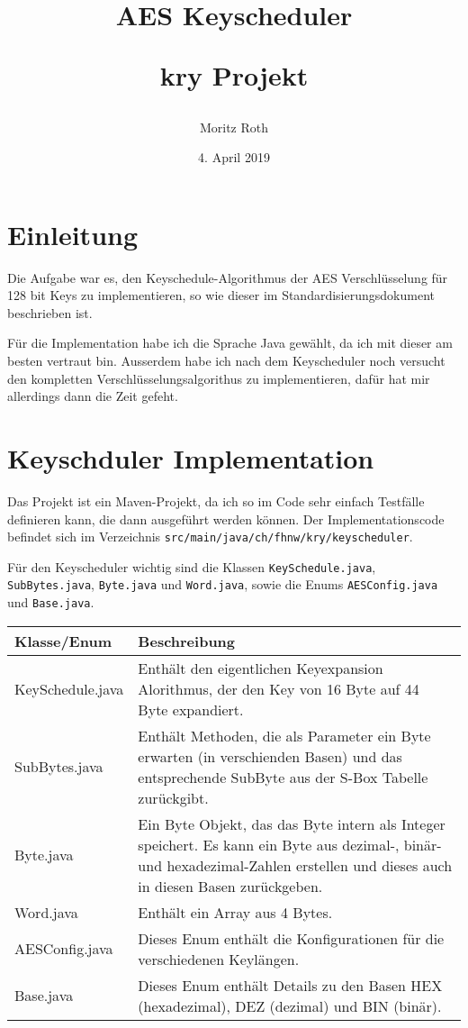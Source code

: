 \documentclass[12pt, letterpaper]{article}
\title{AES Keyscheduler \\
\begin{large}
kry Projekt
\end{large} }
\author{Moritz Roth}
\date{4. April 2019}
\newcommand{\code}[1]{\texttt{#1}}
\begin{document}
\maketitle

\section*{Einleitung}
Die Aufgabe war es, den Keyschedule-Algorithmus der AES Verschlüsselung für 128 bit Keys zu implementieren, so wie dieser im Standardisierungsdokument beschrieben ist.

Für die Implementation habe ich die Sprache Java gewählt, da ich mit dieser am besten vertraut bin. Ausserdem habe ich nach dem Keyscheduler noch versucht den kompletten Verschlüsselungsalgorithus zu implementieren, dafür hat mir allerdings dann die Zeit gefeht.

\section*{Keyschduler Implementation}

Das Projekt ist ein Maven-Projekt, da ich so im Code sehr einfach Testfälle definieren kann, die dann ausgeführt werden können. Der Implementationscode befindet sich im Verzeichnis \code{src/main/java/ch/fhnw/kry/keyscheduler}.


Für den Keyscheduler wichtig sind die Klassen \code{KeySchedule.java}, \code{SubBytes.java}, \code{Byte.java} und \code{Word.java}, sowie die Enums \code{AESConfig.java} und \code{Base.java}.

\begin{center}
  {\tablinesep=10pt\begin{tabular}{l|p{10cm}}
  Klasse/Enum & Beschreibung \\ \hline
  KeySchedule.java & Enthält den eigentlichen Keyexpansion Alorithmus, der den Key von 16 Byte auf 44 Byte expandiert. \\
  SubBytes.java & Enthält Methoden, die als Parameter ein Byte erwarten (in verschienden Basen) und das entsprechende SubByte aus der S-Box Tabelle zurückgibt. \\
  Byte.java & Ein Byte Objekt, das das Byte intern als Integer speichert. Es kann ein Byte aus dezimal-, binär- und hexadezimal-Zahlen erstellen und dieses auch in diesen Basen zurückgeben. \\
  Word.java & Enthält ein Array aus 4 Bytes. \\
  AESConfig.java & Dieses Enum enthält die Konfigurationen für die verschiedenen Keylängen. \\
  Base.java & Dieses Enum enthält Details zu den Basen HEX (hexadezimal), DEZ (dezimal) und BIN (binär).
  \end{tabular}}
\end{center}
\end{document}
